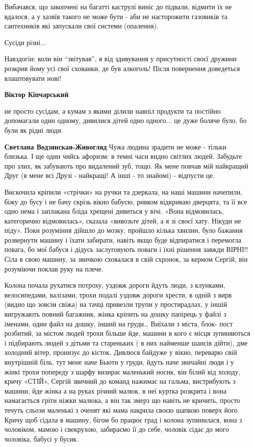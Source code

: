 \begin{itemize}
Вибачався, що закопчені на багатті каструлі виніс до підвали, відмити їх не
вдалося, а у хазяїв такого не може бути - аби не насторожити газовиків та
сантехників які запускали свої системи (опалення).

Сусіди різні...

Навздогін: коли він \enquote{звітував}, я від здивування у присутності своєї дружини
розкрив йому усі свої схованки, де був алкоголь! Після повернення доведеться
влаштовувати нові!

\textbf{Віктор Кіпчарський} 

не просто сусідам, а кумам з якими ділили навпіл продукти та постійно
допомагали один одному, дивилися дітей одно одного... це дуже боляче було, бо
були як рідні люди.

\textbf{Светлана Водзянская-Живогляд} Чужа людина зрадити не може - тільки близька.
І ще один чийсь афоризм: в темні часи видно світлих людей.
Забудьте про злих, як забувають про видалений зуб, тощо.
Як мене повчав мій найкращий Друг (в мене всі Друзі - найкращі! А інші - то знайомі) - відпусти це.


Вискочила кріпили «стрічки» на ручки та дзеркала, на наші машини начепили, біжу
до бусу і не бачу скрізь вікно бабусю, ривком відкриваю дверцята, та її все
одно нема і заплакана бліда хрещені дивиться у вічі. «Вона відмовилась,
категорично відмовилась», сказала «вивозьте дітей, а я зі своєї хату. Нікуди не
піду». Поки розуміння дійшло до мозку, пройшло кілька хвилин, було бажання
розвернути машину і їхати забирати, навіть якщо буде відпиратися і перемогла
повага, бо мої бабуся і дідусь заслуговують поваги і їхні рішення завжди
ВІРНІ!! Сіла в свою машину, за звичкою сховалася в свій схронок, за кермом
Сергій, він розуміючи поклав руку на плече.

Колона почала рухатися потроху, уздовж дороги йдуть люди, з клунками,
велосипедами, валізами, трохи подалі уздовж дороги хрести, в одній з вирв
(видно що зовсім свіжа) на тачці привезли трупи у простирадлах, у іншій
вигружають повний багажник, жінка кріпить на дошку папірець у файлі з іменами,
один файл на дошку, інший на груди… Виїхали з міста, блок- пост розбитий, за
містом людей трохи більше йде, машини в кого є місця зупиняються і підбирають
людей з дітьми та стареньких ( в них найменше шансів дійти), дме холодний
вітер, пронизує до кісток. Дивлюся байдуже у вікно, переварю свій внутрішній
біль, тут мене наче Бьюти у груди, йдуть наче звичайні люди і у жінкі трохи
попереду з шарфу визирає маленький носик, він білий від холоду, кричу «СТІЙ»,
Сергій звичний до команд нажимає на гальма, вистрибують з машини, йде жінка а
на руках річний малюк, в неї куртка розкрита і вона намагається гріти ніжки
малюка, а він так змерз що навіть не кричить, просто течуть сльози маленькі з
оченят які мама накрила своєю шапкою поверх його. Кричу щоб сідала в машину,
бігом бо працює град і колона зупинилася, вона з чоловіком, мамою і свекрухою,
забираємо її до себе, чоловік сідає до мого чоловіка, бабусі у бусик.


\end{itemize}
